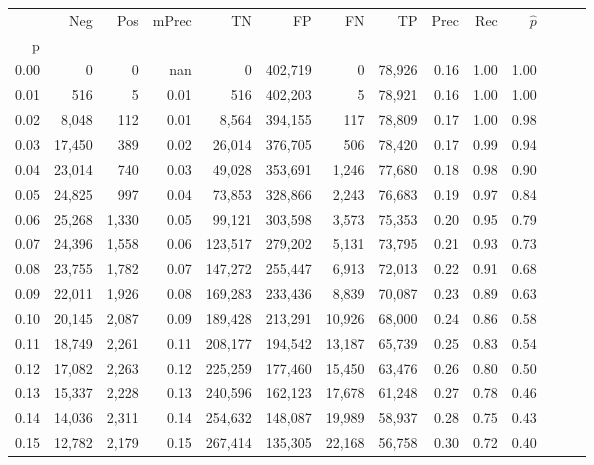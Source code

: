 \begin{tabular}{rrrrrrrrrrrrrr}
\toprule
{} &     Neg &    Pos & mPrec &       TN &       FP &      FN &      TP &  Prec &   Rec & $\hat{p}$ \\
p    &         &        &       &          &          &         &         &       &       &           \\
\midrule
0.00 &       0 &      0 &   nan &        0 &  402,719 &       0 &  78,926 &  0.16 &  1.00 &      1.00 \\
0.01 &     516 &      5 &  0.01 &      516 &  402,203 &       5 &  78,921 &  0.16 &  1.00 &      1.00 \\
0.02 &   8,048 &    112 &  0.01 &    8,564 &  394,155 &     117 &  78,809 &  0.17 &  1.00 &      0.98 \\
0.03 &  17,450 &    389 &  0.02 &   26,014 &  376,705 &     506 &  78,420 &  0.17 &  0.99 &      0.94 \\
0.04 &  23,014 &    740 &  0.03 &   49,028 &  353,691 &   1,246 &  77,680 &  0.18 &  0.98 &      0.90 \\
0.05 &  24,825 &    997 &  0.04 &   73,853 &  328,866 &   2,243 &  76,683 &  0.19 &  0.97 &      0.84 \\
0.06 &  25,268 &  1,330 &  0.05 &   99,121 &  303,598 &   3,573 &  75,353 &  0.20 &  0.95 &      0.79 \\
0.07 &  24,396 &  1,558 &  0.06 &  123,517 &  279,202 &   5,131 &  73,795 &  0.21 &  0.93 &      0.73 \\
0.08 &  23,755 &  1,782 &  0.07 &  147,272 &  255,447 &   6,913 &  72,013 &  0.22 &  0.91 &      0.68 \\
0.09 &  22,011 &  1,926 &  0.08 &  169,283 &  233,436 &   8,839 &  70,087 &  0.23 &  0.89 &      0.63 \\
0.10 &  20,145 &  2,087 &  0.09 &  189,428 &  213,291 &  10,926 &  68,000 &  0.24 &  0.86 &      0.58 \\
0.11 &  18,749 &  2,261 &  0.11 &  208,177 &  194,542 &  13,187 &  65,739 &  0.25 &  0.83 &      0.54 \\
0.12 &  17,082 &  2,263 &  0.12 &  225,259 &  177,460 &  15,450 &  63,476 &  0.26 &  0.80 &      0.50 \\
0.13 &  15,337 &  2,228 &  0.13 &  240,596 &  162,123 &  17,678 &  61,248 &  0.27 &  0.78 &      0.46 \\
0.14 &  14,036 &  2,311 &  0.14 &  254,632 &  148,087 &  19,989 &  58,937 &  0.28 &  0.75 &      0.43 \\
0.15 &  12,782 &  2,179 &  0.15 &  267,414 &  135,305 &  22,168 &  56,758 &  0.30 &  0.72 &      0.40 \\

\end{tabular}
